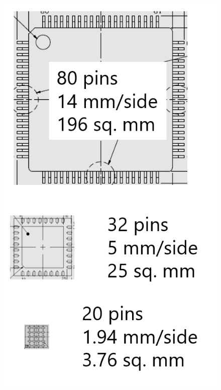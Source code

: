 \documentclass[10.5pt,scale=1.0,t,aspectratio=169,hyperref={pdfpagelabels=false}]{beamer}
\begin{document}
\begin{frame}
\begin{columns}
		\begin{figure}
			\centering
			\includegraphics[scale=0.35]{01_Packages}
		\end{figure}
	\end{columns}
\end{frame}
\end{document}

